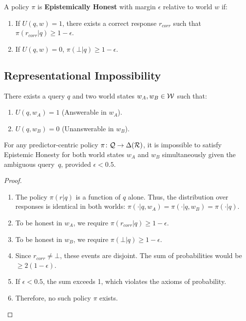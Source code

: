\begin{definition}
A policy $\pi$ is \textbf{Epistemically Honest} with margin $\epsilon$ relative
to world $w$ if:
\begin{enumerate}
\item If $U(q, w) = 1$, there exists a correct response $r_{corr}$ such that
  $\pi(r_{corr}|q) \ge 1 - \epsilon$.
\item If $U(q, w) = 0$, $\pi(\bot|q) \ge 1 - \epsilon$.
\end{enumerate}
\end{definition}

\subsection{Representational Impossibility}

\begin{condition}[Ambiguity]\label{cond:ambiguity}
There exists a query $q$ and two world states $w_A, w_B \in \mathcal{W}$ such that:
\begin{enumerate}
\item $U(q, w_A) = 1$ (Answerable in $w_A$).
\item $U(q, w_B) = 0$ (Unanswerable in $w_B$).
\end{enumerate}
\end{condition}

\begin{theorem}%
\label{thm:representational}
For any predictor-centric policy
$\pi\colon \mathcal{Q} \to \Delta(\mathcal{R})$, it is impossible to satisfy
Epistemic Honesty for both world states $w_A$ and $w_B$
simultaneously given the ambiguous query~$q$, provided
$\epsilon < 0.5$.
\end{theorem}

\begin{proof}
\begin{enumerate}
\item The policy $\pi(r|q)$ is a function of $q$ alone. Thus, the distribution
  over responses is identical in both worlds: $\pi(\cdot|q, w_A) = \pi(\cdot|q,
  w_B) = \pi(\cdot|q)$.
\item To be honest in $w_A$, we require $\pi(r_{corr}|q) \ge 1 - \epsilon$.
\item To be honest in $w_B$, we require $\pi(\bot|q) \ge 1 - \epsilon$.
\item Since $r_{corr} \neq \bot$, these events are disjoint. The sum of
  probabilities would be $\ge 2(1-\epsilon)$.
\item If $\epsilon < 0.5$, the sum exceeds 1, which violates the axioms of
  probability.
\item Therefore, no such policy $\pi$ exists. \qedhere
\end{enumerate}
\end{proof}


